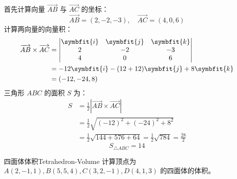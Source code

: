 \begin{solution}
    首先计算向量 $\overrightarrow{AB}$ 与 $\overrightarrow{AC}$ 的坐标：
    \begin{equation*}
        \overrightarrow{AB} = (2, -2, -3), \quad \overrightarrow{AC} = (4, 0, 6)
    \end{equation*}
    计算两向量的向量积：
    \begin{equation*}
        \begin{aligned}
            \overrightarrow{AB} \times \overrightarrow{AC} & = \begin{vmatrix} \symbfit{i} & \symbfit{j} & \symbfit{k} \\ 2 & -2 & -3 \\ 4 & 0 & 6 \end{vmatrix} \\
                                                           & = -12\symbfit{i} - (12 + 12)\symbfit{j} + 8\symbfit{k}                                              \\
                                                           & = (-12, -24, 8)
        \end{aligned}
    \end{equation*}
    三角形 $ABC$ 的面积 $S$ 为：
    \begin{equation*}
        \begin{aligned}
            S & = \frac{1}{2} \left| \overrightarrow{AB} \times \overrightarrow{AC} \right| \\
              & = \frac{1}{2} \sqrt{(-12)^2 + (-24)^2 + 8^2}                                \\
              & = \frac{1}{2} \sqrt{144 + 576 + 64} = \frac{1}{2} \sqrt{784} = \frac{28}{2}
        \end{aligned}
    \end{equation*}
    \begin{equation*}
        \boxed{S_{\triangle ABC} = 14}
    \end{equation*}
\end{solution}

\begin{problem}{四面体体积}{Tetrahedron-Volume}
    计算顶点为 $A(2, -1, 1), B(5, 5, 4), C(3, 2, -1), D(4, 1, 3)$ 的四面体的体积。
\end{problem}

